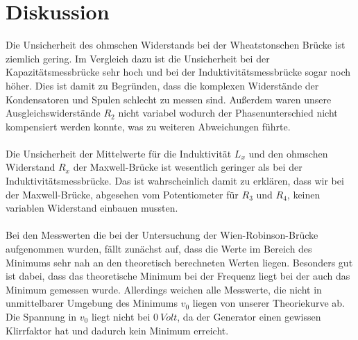\section{Diskussion}
\label{sec:Diskussion}
Die Unsicherheit des ohmschen Widerstands bei der Wheatstonschen Brücke ist ziemlich gering.
Im Vergleich dazu ist die Unsicherheit bei der Kapazitätsmessbrücke sehr hoch und bei der Induktivitätsmessbrücke sogar noch höher.
Dies ist damit zu Begründen, dass die komplexen Widerstände der Kondensatoren und Spulen schlecht zu messen sind.
Außerdem waren unsere Ausgleichswiderstände $R_2$ nicht variabel wodurch der Phasenunterschied nicht kompensiert werden konnte, was zu weiteren Abweichungen führte.
\\\\
Die Unsicherheit der Mittelwerte für die Induktivität $L_x$ und den ohmschen Widerstand $R_x$ der Maxwell-Brücke ist wesentlich geringer als bei der Induktivitätsmessbrücke.
Das ist wahrscheinlich damit zu erklären, dass wir bei der Maxwell-Brücke, abgesehen vom Potentiometer für $R_3$ und $R_4$, keinen variablen Widerstand einbauen mussten.
\\\\
Bei den Messwerten die bei der Untersuchung der Wien-Robinson-Brücke aufgenommen wurden, fällt zunächst auf, dass die Werte im Bereich des Minimums sehr nah an den theoretisch berechneten Werten liegen.
Besonders gut ist dabei, dass das theoretische Minimum bei der Frequenz liegt bei der auch das Minimum gemessen wurde.
Allerdings weichen alle Messwerte, die nicht in unmittelbarer Umgebung des Minimums $v_0$ liegen von unserer Theoriekurve ab.
Die Spannung in $v_0$ liegt nicht bei $\SI{0}{Volt}$, da der Generator einen gewissen Klirrfaktor hat und dadurch kein Minimum erreicht.